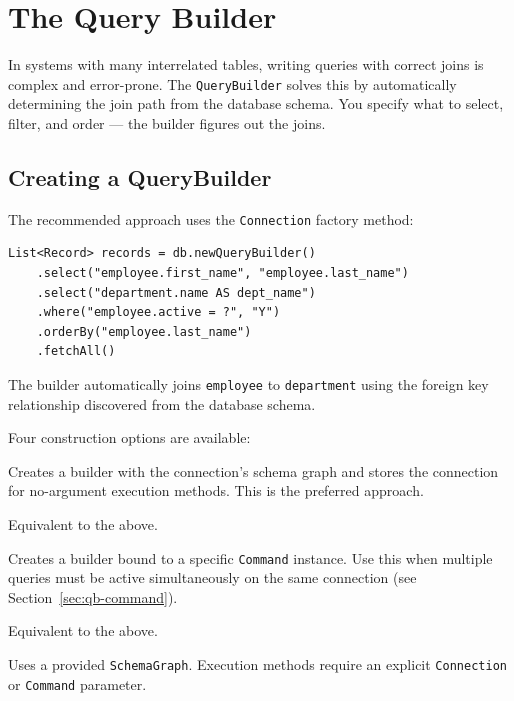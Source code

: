\chapter{The Query Builder}
\label{ch:query-builder}

In systems with many interrelated tables, writing queries with correct joins is complex and error-prone.  The \texttt{QueryBuilder} solves this by automatically determining the join path from the database schema.  You specify what to select, filter, and order --- the builder figures out the joins.

\section{Creating a QueryBuilder}
\label{sec:qb-create}

The recommended approach uses the \texttt{Connection} factory method:

\begin{lstlisting}[style=groovy]
List<Record> records = db.newQueryBuilder()
    .select("employee.first_name", "employee.last_name")
    .select("department.name AS dept_name")
    .where("employee.active = ?", "Y")
    .orderBy("employee.last_name")
    .fetchAll()
\end{lstlisting}

\noindent
The builder automatically joins \texttt{employee} to \texttt{department} using the foreign key relationship discovered from the database schema.

Four construction options are available:

\begin{description}[style=nextline]
  \item[\texttt{db.newQueryBuilder()}] Creates a builder with the connection's schema graph and stores the connection for no-argument execution methods.  This is the preferred approach.
  \item[\texttt{new QueryBuilder(conn)}] Equivalent to the above.
  \item[\texttt{cmd.newQueryBuilder()}] Creates a builder bound to a specific \texttt{Command} instance.  Use this when multiple queries must be active simultaneously on the same connection (see Section~\ref{sec:qb-command}).
  \item[\texttt{new QueryBuilder(cmd)}] Equivalent to the above.
  \item[\texttt{new QueryBuilder(schemaGraph)}] Uses a provided \texttt{SchemaGraph}.  Execution methods require an explicit \texttt{Connection} or \texttt{Command} parameter.
\end{description}

